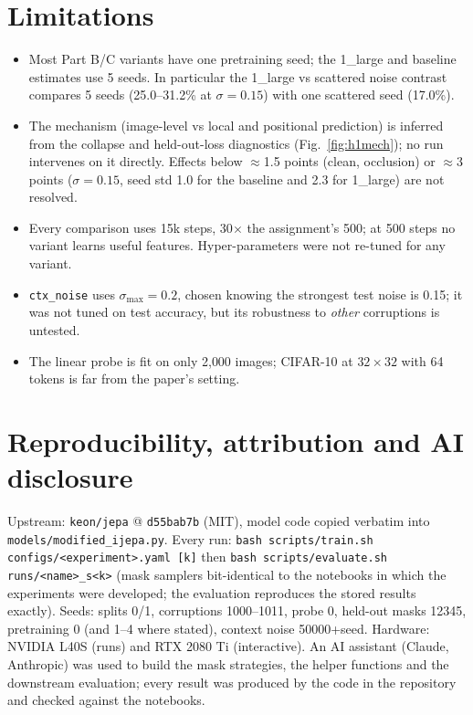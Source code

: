 \documentclass[10pt]{article}
\begin{document}
\section{Limitations}
\begin{itemize}
\item Most Part B/C variants have one pretraining seed; the 1\_large and baseline estimates use 5 seeds. In particular the
1\_large vs scattered noise contrast compares 5 seeds (25.0--31.2\% at $\sigma{=}0.15$) with one scattered seed (17.0\%).
\item The mechanism (image-level vs local and positional prediction) is inferred from the collapse and held-out-loss
diagnostics (Fig.~\ref{fig:h1mech}); no run intervenes on it directly. Effects below
$\approx$1.5 points (clean, occlusion) or $\approx$3 points ($\sigma{=}0.15$, seed std 1.0 for the baseline and 2.3 for 1\_large) are not resolved.
\item Every comparison uses 15k steps, 30$\times$ the assignment's 500; at 500 steps no variant learns useful features.
Hyper-parameters were not re-tuned for any variant.
\item \texttt{ctx\_noise} uses $\sigma_{\max}{=}0.2$, chosen knowing the strongest test noise is 0.15; it was not tuned on
test accuracy, but its robustness to \emph{other} corruptions is untested.
\item The linear probe is fit on only 2{,}000 images; CIFAR-10 at $32{\times}32$ with 64 tokens is far from the paper's setting.
\end{itemize}

\section*{Reproducibility, attribution and AI disclosure}
Upstream: \texttt{keon/jepa} @ \texttt{d55bab7b} (MIT), model code copied verbatim into \texttt{models/modified\_ijepa.py}.
Every run: \texttt{bash scripts/train.sh configs/<experiment>.yaml [k]} then \texttt{bash scripts/evaluate.sh runs/<name>\_s<k>}
(mask samplers bit-identical to the notebooks in which the experiments were developed; the evaluation reproduces the
stored results exactly). Seeds: splits 0/1,
corruptions 1000--1011, probe 0, held-out masks 12345, pretraining 0 (and 1--4 where stated), context noise 50000+seed.
Hardware: NVIDIA L40S (runs) and RTX 2080 Ti (interactive). An AI assistant (Claude, Anthropic) was used to build the
mask strategies, the helper functions and the downstream evaluation; every result was produced by the code in the
repository and checked against the notebooks.
\end{document}
